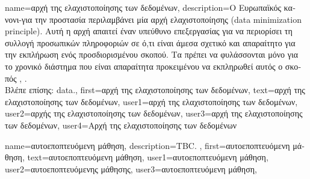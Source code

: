 {name={\foreignlanguage{greek}{αρχή της ελαχιστοποίησης των δεδομένων}},
	description={\foreignlanguage{greek}{Ο Ευρωπαϊκός κανονι- για την 
		προστασία}  
		\foreignlanguage{greek}{περιλαμβάνει μία αρχή ελαχιστο\-ποί\-ησης}  (data minimization principle). 
		\foreignlanguage{greek}{Αυτή η αρχή απαιτεί έναν υπεύθυνο επεξεργασίας}  \foreignlanguage{greek}{για να 
		περιορίσει τη συλλογή προσωπικών πληροφοριών σε ό,τι είναι άμεσα σχετικό και απαραίτητο για την εκπλήρωση ενός 
		προσδιορισμένου σκοπού. Τα}  \foreignlanguage{greek}{πρέπει να φυλάσσονται μόνο για το χρονικό διάστημα 
		που είναι απαραίτητα προκειμένου να εκπληρωθεί αυτός ο σκοπός} 
		\cite[\foreignlanguage{greek}{Άρθρο} 5(1)(c)]{GDPR2016}, \cite{EURegulation2018}.
		\\
		\foreignlanguage{greek}{Βλέπε επίσης:} \gls{data}.}, 
	first={\foreignlanguage{greek}{αρχή της ελαχιστοποίησης των δεδομένων}},
	text={\foreignlanguage{greek}{αρχή της ελαχιστοποίησης των δεδομένων}},
	user1={\foreignlanguage{greek}{αρχή της ελαχιστοποίησης των δεδομένων}}, %
  	user2={\foreignlanguage{greek}{αρχής της ελαχιστοποίησης των δεδομένων}}, %
	user3={\foreignlanguage{greek}{αρχή της ελαχιστοποίησης των δεδομένων}}, %
	user4={\foreignlanguage{greek}{Αρχή της ελαχιστοποίησης των δεδομένων}} %
}

{name={\foreignlanguage{greek}{αυτοεποπτευόμενη μάθηση}},
 	description={TBC. }, 
   	first={\foreignlanguage{greek}{αυτοεποπτευόμενη μάθηση}}, 
   	text={\foreignlanguage{greek}{αυτοεποπτευόμενη μάθηση}},
	user1={\foreignlanguage{greek}{αυτοεποπτευόμενη μάθηση}}, %
  	user2={\foreignlanguage{greek}{αυτοεποπτευόμενης μάθησης}}, %
	user3={\foreignlanguage{greek}{αυτοεποπτευόμενη μάθηση}}, %
}

